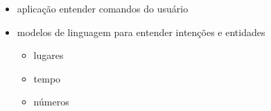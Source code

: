 
\begin{itemize}
	\item aplicação entender comandos do usuário
	\item modelos de linguagem para entender intenções e entidades
		\begin{itemize}
			\item lugares
			\item tempo
			\item números
		\end{itemize}
\end{itemize}
